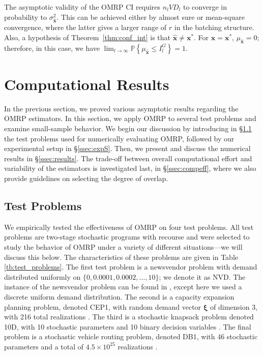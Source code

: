 \documentclass[12pt]{article}
\newcommand{\p}[1]{\mathbb{P} \left\{ #1 \right\}}
\newcommand{\x}{\mathbf{x}}
\newcommand{\xh}{{\hat{\x}}}
\newcommand{\xs}{\x^*}
\newcommand{\xit}{\boldsymbol{\xi}}
\begin{document}
The asymptotic validity of the OMRP CI requires $n_l VD_l$ to converge in probability to $\sigma^{2}_{\xh}$. 
This can be achieved either by almost sure or mean-square convergence, where the latter gives a larger range of $r$ in the batching structure.
Also, a hypothesis of Theorem~\ref{thm:conf_int} is that $\xh \neq \xs$.  
For $\xh = \xs$, $\mu_\xh = 0$; therefore, in this case, we have $\lim_{l\rightarrow\infty} \p{\mu_\xh \leq I^G_l} = 1$. 

\section{Computational Results}
\label{sec:comp}

In the previous section, we proved various asymptotic results regarding the OMRP estimators. 
In this section, we apply OMRP to several test problems and examine small-sample behavior. 
We begin our discussion by introducing in \S \ref{ssec:test} the test problems used for numerically evaluating OMRP, followed by our experimental setup in \S \ref{ssec:expS}. 
Then, we present and discuss the numerical results in \S \ref{ssec:results}.
The trade-off between overall computational effort and variability of the estimators is investigated last, in \S \ref{ssec:compeff}, where we also provide guidelines on selecting the degree of overlap. 

\subsection{Test Problems}
\label{ssec:test}


We empirically tested the effectiveness of OMRP on four test problems.
All test problems are two-stage stochastic programs with recourse and were selected to study the behavior of OMRP under a variety of different situations---we will discuss this below.
The characteristics of these problems are given in Table \ref{tb:test_problems}. 
The first test problem is a newsvendor problem with demand distributed uniformly on $\{0, 0.0001, 0.0002, \dots, 10\}$; we denote it as NVD.
The instance of the newsvendor problem can be found in \citep{Bayraksan2006}, except here we used a discrete uniform demand distribution.
The second is a capacity expansion planning problem, denoted CEP1, with random demand vector $\xit$ of dimension 3, with 216 total realizations \citep{higle1996}.
The third is a stochastic knapsack problem denoted 10D, with 10 stochastic parameters and 10 binary decision variables \citep{kleywegt2002sample}.
The final problem is a stochastic vehicle routing problem, denoted DB1, with 46 stochastic parameters and a total of $4.5 \times 10^{25}$ realizations \citep{donohue1995upper}.
\end{document}
